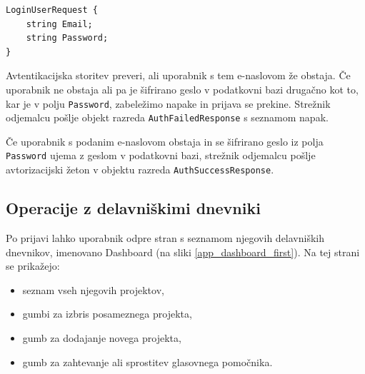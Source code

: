 \documentclass[a4paper, 12pt]{book}
\begin{document}
\begin{verbatim}
LoginUserRequest {
    string Email; 
    string Password; 
} 
\end{verbatim}

Avtentikacijska storitev preveri, ali uporabnik s tem e-naslovom že obstaja.
Če uporabnik ne obstaja ali pa je šifrirano geslo v podatkovni bazi drugačno kot to, kar je v polju \texttt{Password}, zabeležimo napake in prijava se prekine.
Strežnik odjemalcu pošlje objekt razreda \texttt{AuthFailedResponse} s seznamom napak.

Če uporabnik s podanim e-naslovom obstaja in se šifrirano geslo iz polja \texttt{Password} ujema z geslom v podatkovni bazi, strežnik odjemalcu pošlje avtorizacijski žeton v objektu razreda \texttt{AuthSuccessResponse}.




\subsection{Operacije z delavniškimi dnevniki}

Po prijavi lahko uporabnik odpre stran s seznamom njegovih delavniških dnevnikov, imenovano Dashboard (na sliki \ref{app_dashboard_first}).
Na tej strani se prikažejo:
\begin{itemize}
	\item seznam vseh njegovih projektov, 
	\item gumbi za izbris posameznega projekta,
	\item gumb za dodajanje novega projekta, 
	\item gumb za zahtevanje ali sprostitev glasovnega pomočnika.
\end{itemize}


\clearpage
\end{document}
